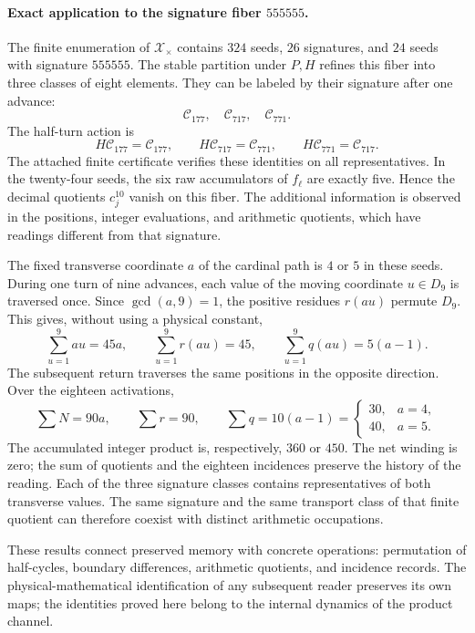\paragraph{Exact application to the signature fiber \texorpdfstring{$555555$}{555555}.}

The finite enumeration of $\mathscr X_\times$ contains $324$ seeds,
$26$ signatures, and $24$ seeds with signature $555555$. The stable
partition under $P,H$ refines this fiber into three classes of eight elements.
They can be labeled by their signature after one advance:
\[
 \mathscr C_{177},\quad\mathscr C_{717},\quad\mathscr C_{771}.
\]
The half-turn action is
\[
 H\mathscr C_{177}=\mathscr C_{177},\qquad
 H\mathscr C_{717}=\mathscr C_{771},\qquad
 H\mathscr C_{771}=\mathscr C_{717}.
\]
The attached finite certificate verifies these identities on all
representatives. In the twenty-four seeds, the six raw accumulators
of $f_\ell$ are exactly five. Hence the decimal quotients
$c_j^{10}$ vanish on this fiber. The additional information
is observed in the positions, integer evaluations, and arithmetic
quotients, which have readings different from that signature.

The fixed transverse coordinate $a$ of the cardinal path is $4$ or
$5$ in these seeds. During one turn of nine advances, each
value of the moving coordinate $u\in D_9$ is traversed once. Since
$\gcd(a,9)=1$, the positive residues $r(au)$ permute $D_9$.
This gives, without using a physical constant,
\[
 \sum_{u=1}^9au=45a,\qquad
 \sum_{u=1}^9r(au)=45,\qquad
 \sum_{u=1}^9q(au)=5(a-1).
\]
The subsequent return traverses the same positions in the opposite direction.
Over the eighteen activations,
\begin{equation}
 \sum N=90a,\qquad\sum r=90,\qquad
 \sum q=10(a-1)=
 \begin{cases}30,&a=4,\\40,&a=5.\end{cases}
 \label{bim09:ocupacion-30-40}
\end{equation}
The accumulated integer product is, respectively, $360$ or $450$.
The net winding is zero; the sum of quotients and the eighteen
incidences preserve the history of the reading. Each of the three
signature classes contains representatives of both transverse values.
The same signature and the same transport class of that finite quotient
can therefore coexist with distinct arithmetic occupations.

These results connect preserved memory with concrete
operations: permutation of half-cycles, boundary differences,
arithmetic quotients, and incidence records. The physical-mathematical
identification of any subsequent reader preserves its own
maps; the identities proved here belong to the internal dynamics
of the product channel.
